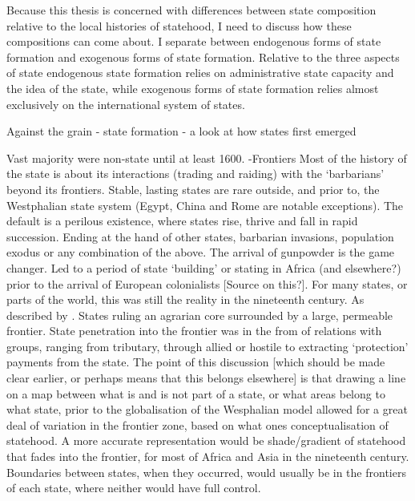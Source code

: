 \documentclass[12pt]{article}
\begin{document}
Because this thesis is concerned with differences between state composition
relative to the local histories of statehood, I need to discuss how these
compositions can come about. I separate between endogenous forms of state
formation and exogenous forms of state formation. Relative to the three aspects
of state endogenous state formation relies on administrative state capacity and
the idea of the state, while exogenous forms of state formation relies almost
exclusively on the international system of states.

\citet{scott2017against} Against the grain - state formation - a look at how
states first emerged

Vast majority were non-state until at least 1600. -Frontiers Most of the history
of the state is about its interactions (trading and raiding) with the
`barbarians' beyond its frontiers. Stable, lasting states are rare outside, and
prior to, the Westphalian state system (Egypt, China and Rome are notable
exceptions). The default is a perilous existence, where states rise, thrive and
fall in rapid succession. Ending at the hand of other states, barbarian
invasions, population exodus or any combination of the above. The arrival of
gunpowder is the game changer. Led to a period of state `building' or stating in
Africa (and elsewhere?) prior to the arrival of European colonialists [Source on
this?]. For many states, or parts of the world, this was still the reality in
the nineteenth century. As described by	\citet{Scott2009}. States ruling an
agrarian core surrounded by a large, permeable frontier. State penetration into
the frontier was in the from of relations with groups, ranging from tributary,
through allied or hostile to extracting `protection' payments from the state.
The point of this discussion [which should be made clear earlier, or perhaps
means that this belongs elsewhere] is that drawing a line on a map between what
is and is not part of a state, or what areas belong to what state, prior to the
globalisation of the Wesphalian model allowed for a great deal of variation in
the frontier zone, based on what ones conceptualisation of statehood. A more
accurate representation would be shade/gradient of statehood that fades into the
frontier, for most of Africa and Asia in the nineteenth century. Boundaries
between states, when they occurred, would usually be in the frontiers of each
state, where neither would have full control.
\end{document}
